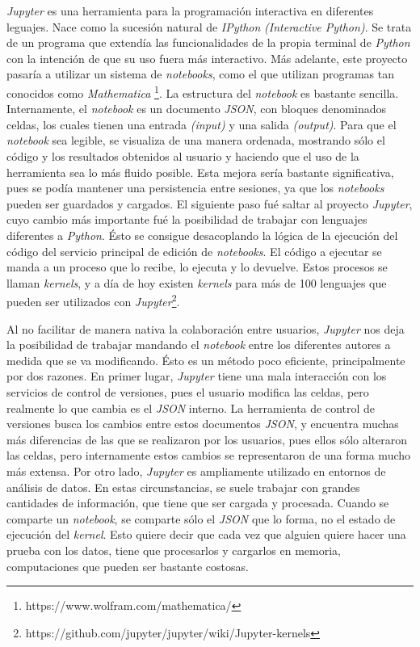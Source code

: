 \documentclass[11pt,spanish,listoffigures]{tfgetsinf}
\begin{document}
\textit{Jupyter } es una herramienta para la programación interactiva en diferentes leguajes. Nace como la sucesión natural de \textit{IPython} \textit{(Interactive Python)}. Se trata de un programa que extendía las funcionalidades de la propia terminal de \textit{Python} con la intención de que su uso fuera más interactivo. Más adelante, este proyecto pasaría a utilizar un sistema de \textit{notebooks}, como el que utilizan programas tan conocidos como \textit{Mathematica} \footnote{https://www.wolfram.com/mathematica/}. La estructura del \textit{notebook} es bastante sencilla. Internamente, el \textit{notebook} es un documento \textit{\gls{JSON}}, con bloques denominados celdas, los cuales tienen una entrada \textit{(input)} y una salida \textit{(output)}. Para que el \textit{notebook} sea legible, se visualiza de una manera ordenada, mostrando sólo el código y los resultados obtenidos al usuario y haciendo que el uso de la herramienta sea lo más fluido posible.   
Esta mejora sería bastante significativa, pues se podía mantener una persistencia entre sesiones, ya que los \textit{notebooks} pueden ser guardados y cargados. El siguiente paso fué saltar al proyecto \textit{Jupyter}, cuyo cambio más importante fué la posibilidad de trabajar con lenguajes diferentes a \textit{Python}. Ésto se consigue desacoplando la lógica de la ejecución del código del servicio principal de edición de \textit{notebooks}. El código a ejecutar se manda a un proceso que lo recibe, lo ejecuta y lo devuelve. Estos procesos se llaman \textit{kernels}, y a día de hoy existen \textit{kernels} para más de 100 lenguajes que pueden ser utilizados con \textit{Jupyter}\footnote{https://github.com/jupyter/jupyter/wiki/Jupyter-kernels}.

Al no facilitar de manera nativa la colaboración entre usuarios, \textit{Jupyter} nos deja la posibilidad de trabajar mandando el \textit{notebook} entre los diferentes autores a medida que se va modificando. Ésto es un método poco eficiente, principalmente por dos razones. En primer lugar, \textit{Jupyter} tiene una mala interacción con los servicios de control de versiones, pues el usuario modifica las celdas, pero realmente lo que cambia es el \textit{JSON} interno. La herramienta de control de versiones busca los cambios entre estos documentos \textit{JSON}, y encuentra muchas más diferencias de las que se realizaron por los usuarios, pues ellos sólo alteraron las celdas, pero internamente estos cambios se representaron de una forma mucho más extensa.
Por otro lado, \textit{Jupyter} es ampliamente utilizado en entornos de análisis de datos. En estas circunstancias, se suele trabajar con grandes cantidades de información, que tiene que ser cargada y procesada. Cuando se comparte un \textit{notebook}, se comparte sólo el \textit{JSON} que lo forma, no el estado de ejecución del \textit{kernel}. Esto quiere decir que cada vez que alguien quiere hacer una prueba con los datos, tiene que procesarlos y cargarlos en memoria, computaciones que pueden ser bastante costosas.
\end{document}
